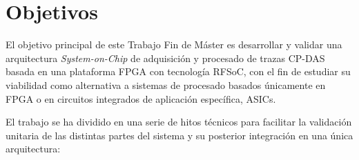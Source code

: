 \chapter{Objetivos}

El objetivo principal de este Trabajo Fin de Máster es desarrollar y validar una arquitectura \textit{System-on-Chip} de adquisición y procesado de trazas CP-DAS basada en una plataforma FPGA con tecnología RFSoC, con el fin de estudiar su viabilidad como alternativa a sistemas de procesado basados únicamente en FPGA o en circuitos integrados de aplicación específica, ASICs.

El trabajo se ha dividido en una serie de hitos técnicos para facilitar la validación unitaria de las distintas partes del sistema y su posterior integración en una única arquitectura:

